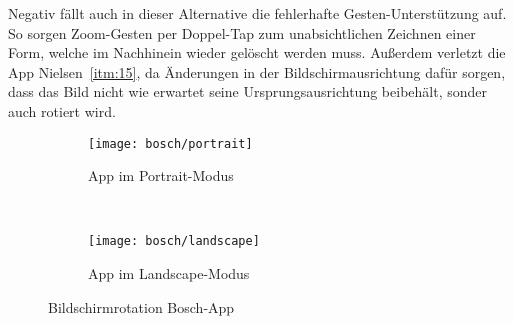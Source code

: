 Negativ fällt auch in dieser Alternative die fehlerhafte Gesten-Unterstützung auf. So sorgen Zoom-Gesten per Doppel-Tap zum unabsichtlichen Zeichnen einer Form, welche im Nachhinein wieder gelöscht werden muss. Außerdem verletzt die App Nielsen~\ref{itm:15}, da Änderungen in der Bildschirmausrichtung dafür sorgen, dass das Bild nicht wie erwartet seine Ursprungsausrichtung beibehält, sonder auch rotiert wird. 

\begin{figure}[h]
	\begin{subfigure}[b]{0.5\textwidth}
		\texttt{[image: bosch/portrait]}
		\caption{App im Portrait-Modus}
		\label{fig:bportait}	
	\end{subfigure}
	~
	\begin{subfigure}[b]{0.5\textwidth}
		\texttt{[image: bosch/landscape]}
		\caption{App im Landscape-Modus}
		\label{fig:blandscape}	
	\end{subfigure}
	\caption{Bildschirmrotation Bosch-App}
	\label{fig:borientation}
\end{figure}
